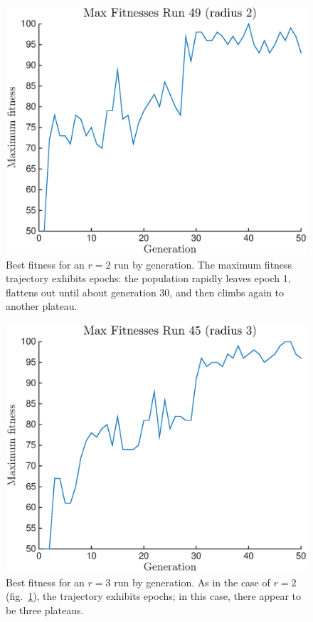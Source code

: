 \begin{figure} [H]
\begin{center}
\includegraphics[width=\linewidth]{figures/max_epoch_radius2.eps}
\caption{Best fitness for an $r = 2$ run by generation. The maximum fitness trajectory exhibits epochs: the population rapidly leaves epoch 1, flattens out until about generation 30, and then climbs again to another plateau.}
\label{fig:r2_best_fit}
\end{center}
\end{figure}
\begin{figure} 
\begin{center}
\includegraphics[width=\linewidth]{figures/max_epoch_radius3.eps}
\caption{Best fitness for an $r = 3$ run by generation. As in the case of $r = 2$ (fig.~\ref{fig:r2_best_fit}), the trajectory exhibits epochs; in this case, there appear to be three plateaus.}
\label{fig:r3_best_fit}
\end{center}
\end{figure}

